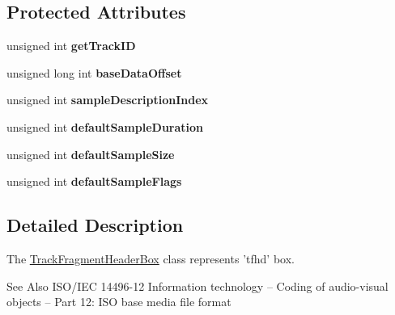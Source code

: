 \subsection*{Protected Attributes}
\begin{DoxyCompactItemize}
\item 
\hypertarget{class_track_fragment_header_box_a3268b90e1f88575a16e20602198ae7a0}{unsigned int {\bfseries get\-Track\-I\-D}}\label{class_track_fragment_header_box_a3268b90e1f88575a16e20602198ae7a0}

\item 
\hypertarget{class_track_fragment_header_box_a7f7b9dd7d08115df2f90861151614d3b}{unsigned long int {\bfseries base\-Data\-Offset}}\label{class_track_fragment_header_box_a7f7b9dd7d08115df2f90861151614d3b}

\item 
\hypertarget{class_track_fragment_header_box_a0bbf5c4edb4435b10a80fd91d3e1e6db}{unsigned int {\bfseries sample\-Description\-Index}}\label{class_track_fragment_header_box_a0bbf5c4edb4435b10a80fd91d3e1e6db}

\item 
\hypertarget{class_track_fragment_header_box_a56b5198c252fb6cc7c3ecc4846c25b08}{unsigned int {\bfseries default\-Sample\-Duration}}\label{class_track_fragment_header_box_a56b5198c252fb6cc7c3ecc4846c25b08}

\item 
\hypertarget{class_track_fragment_header_box_a8024a48471ad5642390c7a7a041f20a9}{unsigned int {\bfseries default\-Sample\-Size}}\label{class_track_fragment_header_box_a8024a48471ad5642390c7a7a041f20a9}

\item 
\hypertarget{class_track_fragment_header_box_a2ffeff2a9c435749acfe7709bf6c7cf1}{unsigned int {\bfseries default\-Sample\-Flags}}\label{class_track_fragment_header_box_a2ffeff2a9c435749acfe7709bf6c7cf1}

\end{DoxyCompactItemize}


\subsection{Detailed Description}
The \hyperlink{class_track_fragment_header_box}{Track\-Fragment\-Header\-Box} class represents 'tfhd' box. 

\begin{DoxySeeAlso}{See Also}
I\-S\-O/\-I\-E\-C 14496-\/12 Information technology – Coding of audio-\/visual objects – Part 12\-: I\-S\-O base media file format 
\end{DoxySeeAlso}


